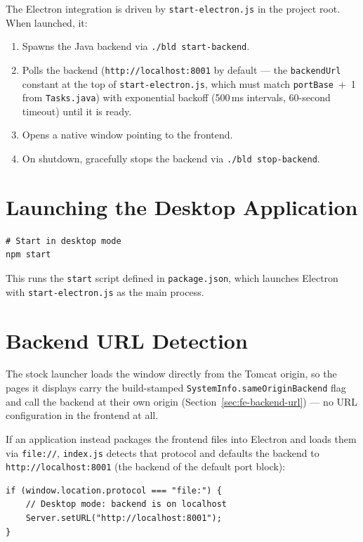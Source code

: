 The Electron integration is driven by \texttt{start-electron.js} in the project root.  When launched, it:

\begin{enumerate}
  \item Spawns the Java backend via \texttt{./bld start-backend}.
  \item Polls the backend (\texttt{http://localhost:8001} by default --- the \texttt{backendUrl} constant at the top of \texttt{start-electron.js}, which must match \texttt{portBase}~+~1 from \texttt{Tasks.java}) with exponential backoff (500\,ms intervals, 60-second timeout) until it is ready.
  \item Opens a native window pointing to the frontend.
  \item On shutdown, gracefully stops the backend via \texttt{./bld stop-backend}.
\end{enumerate}

\section{Launching the Desktop Application}
\label{sec:desk-launch}

\begin{lstlisting}[style=shell]
# Start in desktop mode
npm start
\end{lstlisting}

\noindent
This runs the \texttt{start} script defined in \texttt{package.json}, which launches Electron with \texttt{start-electron.js} as the main process.

\section{Backend URL Detection}
\label{sec:desk-url}

The stock launcher loads the window directly from the Tomcat origin, so the pages it displays carry the build-stamped \texttt{SystemInfo.sameOriginBackend} flag and call the backend at their own origin (Section~\ref{sec:fe-backend-url}) --- no URL configuration in the frontend at all.

If an application instead packages the frontend files into Electron and loads them via \texttt{file://}, \texttt{index.js} detects that protocol and defaults the backend to \texttt{http://localhost:8001} (the backend of the default port block):

\begin{lstlisting}[style=javascript]
if (window.location.protocol === "file:") {
    // Desktop mode: backend is on localhost
    Server.setURL("http://localhost:8001");
}
\end{lstlisting}

